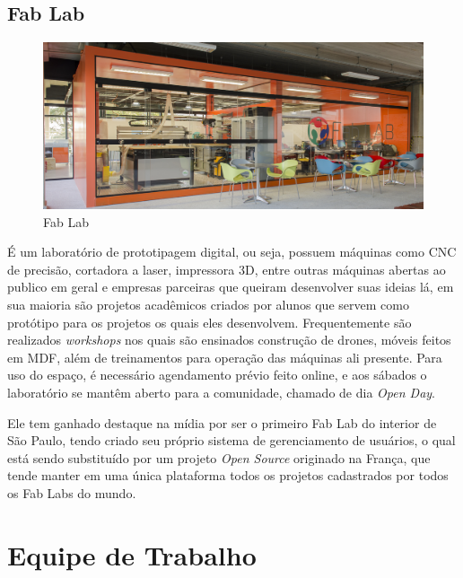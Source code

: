 \documentclass[
	12pt,				%
	oneside,			%
	a4paper,			%
	chapter=TITLE,		%
	section=TITLE,		%
	sumario=tradicional %
	english,			%
	french,				%
	spanish,			%
	brazil				%
	]{abntex2}
\begin{document}
\subsection{Fab Lab}

\begin{figure}[htb]
	\caption{\label{fig:fablab} Fab Lab}
	\begin{center}
		\includegraphics[scale=0.7]{fablab}
	\end{center}
\end{figure}

É um laboratório de prototipagem digital, ou seja, possuem máquinas como CNC de precisão, cortadora a laser, impressora 3D, entre outras máquinas abertas ao publico em geral e empresas parceiras que queiram desenvolver suas ideias lá, em sua maioria são projetos acadêmicos criados por alunos que servem como protótipo para os projetos os quais eles desenvolvem. Frequentemente são realizados \textit{workshops} nos quais são ensinados construção de drones, móveis feitos em MDF, além de treinamentos para operação das máquinas ali presente. Para uso do espaço, é necessário agendamento prévio feito online, e aos sábados o laboratório se mantêm aberto para a comunidade, chamado de dia \textit{Open Day}.

Ele tem ganhado destaque na mídia por ser o primeiro Fab Lab do interior de São Paulo, tendo criado seu próprio sistema de gerenciamento de usuários, o qual está sendo substituído por um projeto \textit{Open Source} originado na França, que tende manter em uma única plataforma todos os projetos cadastrados por todos os Fab Labs do mundo. 

\section{Equipe de Trabalho}
\end{document}
